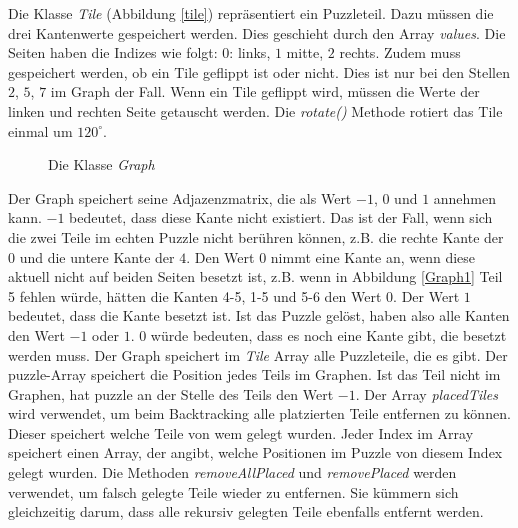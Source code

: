 \documentclass[a4paper, 12pt]{scrartcl}
\begin{document}
Die Klasse \emph{Tile} (Abbildung \ref{tile}) repräsentiert ein Puzzleteil. Dazu müssen die drei Kantenwerte gespeichert werden. Dies geschieht durch den Array \emph{values}. Die Seiten haben die Indizes wie folgt: $0$: links, $1$ mitte, $2$ rechts. Zudem muss gespeichert werden, ob ein Tile geflippt ist oder nicht. Dies ist nur bei den Stellen $2$, $5$, $7$ im Graph der Fall. Wenn ein Tile geflippt wird, müssen die Werte der linken und rechten Seite getauscht werden. Die \emph{rotate()} Methode rotiert das Tile einmal um $120^\circ$.

\begin{figure}[h]
    \centering
    \caption{Die Klasse \emph{Graph}}
\end{figure}

Der Graph speichert seine Adjazenzmatrix, die als Wert $-1$, $0$ und $1$ annehmen kann. $-1$ bedeutet, dass diese Kante nicht existiert. Das ist der Fall, wenn sich die zwei Teile im echten Puzzle nicht berühren können, z.B. die rechte Kante der $0$ und die untere Kante der $4$. Den Wert $0$ nimmt eine Kante an, wenn diese aktuell nicht auf beiden Seiten besetzt ist, z.B. wenn in Abbildung \ref{Graph1} Teil 5 fehlen würde, hätten die Kanten 4-5, 1-5 und 5-6 den Wert $0$. Der Wert $1$ bedeutet, dass die Kante besetzt ist. Ist das Puzzle gelöst, haben also alle Kanten den Wert $-1$ oder $1$. $0$ würde bedeuten, dass es noch eine Kante gibt, die besetzt werden muss. Der Graph speichert im \emph{Tile} Array alle Puzzleteile, die es gibt. Der puzzle-Array speichert die Position jedes Teils im Graphen. Ist das Teil nicht im Graphen, hat puzzle an der Stelle des Teils den Wert $-1$. Der Array \emph{placedTiles} wird verwendet, um beim Backtracking alle platzierten Teile entfernen zu können. Dieser speichert welche Teile von wem gelegt wurden. Jeder Index im Array speichert einen Array, der angibt, welche Positionen im Puzzle von diesem Index gelegt wurden. Die Methoden \emph{removeAllPlaced} und \emph{removePlaced} werden verwendet, um falsch gelegte Teile wieder zu entfernen. Sie kümmern sich gleichzeitig darum, dass alle rekursiv gelegten Teile ebenfalls entfernt werden.
\end{document}

